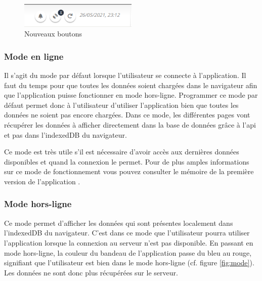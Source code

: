 \documentclass{EPL-master-thesis-covers-FR}
\begin{document}
				\begin{figure}[H]
					\centering
					\includegraphics[width=0.5\textwidth]{images/buttons}
					\caption{Nouveaux boutons}
					\label{fig:buttons}
				\end{figure}
			
			\subsubsection*{Mode en ligne}
				Il s'agit du mode par défaut lorsque l'utilisateur se connecte à l'application. Il faut du temps pour que toutes les données soient chargées dans le navigateur afin que l'application puisse fonctionner en mode hors-ligne. Programmer ce mode par défaut permet donc à l'utilisateur d'utiliser l'application bien que toutes les données ne soient pas encore chargées. Dans ce mode, les différentes pages vont récupérer les données à afficher directement dans la base de données grâce à l'\gls{api} et pas dans l'indexedDB du navigateur. 
				
				Ce mode est très utile s'il est nécessaire d'avoir accès aux dernières données disponibles et quand la connexion le permet. Pour de plus amples informations sur ce mode de fonctionnement vous pouvez consulter le mémoire de la première version de l'application \cite{ref:haitiwater}.
			
			
			\subsubsection*{Mode hors-ligne}
				Ce mode permet d'afficher les données qui sont présentes localement dans l'indexedDB du navigateur. C'est dans ce mode que l'utilisateur pourra utiliser l'application lorsque la connexion au serveur n'est pas disponible. En passant en mode hors-ligne, la couleur du bandeau de l'application passe du bleu au rouge, signifiant que l'utilisateur est bien dans le mode hors-ligne (cf. figure \ref{fig:mode}). Les données ne sont donc plus récupérées sur le serveur.
								
\end{document}
